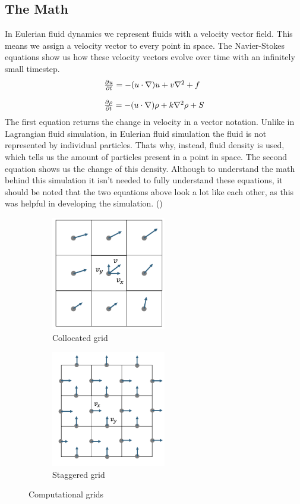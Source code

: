 \documentclass[a4paper,12pt]{article}
\begin{document}
\subsection{The Math} \label{math}
In Eulerian fluid dynamics we represent fluids with a velocity vector field. This means we assign a velocity vector to every point in space.
The Navier-Stokes equations show us how these velocity vectors evolve over time with an infinitely small timestep.
\[
	\begin{array}{ll}
		\pdv{u}{t} = -(u \cdot \nabla)u + v\nabla^2 + f \\
		\\
		\pdv{\rho}{t} = -(u \cdot \nabla)\rho + k\nabla^2\rho + S
	\end{array}
\]
The first equation returns the change in velocity in a vector notation. 
Unlike in Lagrangian fluid simulation, in Eulerian fluid simulation the fluid is not represented by individual particles. 
Thats why, instead, fluid density is used, which tells us the amount of particles present in a point in space. 
The second equation shows us the change of this density. 
Although to understand the math behind this simulation it isn't needed to fully understand these equations, it should be noted that the two equations above look a lot like each other,
as this was helpful in developing the simulation. (\cite{josstam})

\begin{figure}[H]
\centering
\begin{subfigure}{.5\textwidth}
	\centering
	\includegraphics[width=5cm]{resources/collocated_grid_2.png}
	\caption{Collocated grid}
\end{subfigure}%
\begin{subfigure}{.5\textwidth}
	\centering
	\includegraphics[width=5cm]{resources/staggered_grid_2.png}
	\caption{Staggered grid}
\end{subfigure}
\caption{Computational grids}
\label{fig:grids}
\end{figure}
\end{document}

